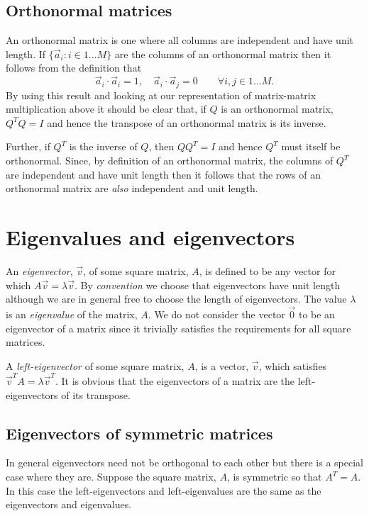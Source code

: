 \documentclass[a4paper]{article}
\newcommand{\highlight}[1]{{\color{blue}#1}}
\begin{document}
\subsection{Orthonormal matrices}

An orthonormal matrix is one where all columns are \highlight{independent} and
\highlight{have unit length}. If $\{ \vec{a}_i : i \in 1 \dots M \}$ are the
columns of an orthonormal matrix then it follows from the definition that
\highlight{\[
  \vec{a}_i \cdot \vec{a}_i = 1, \quad \vec{a}_i \cdot \vec{a}_j = 0 \qquad
  \forall i, j \in 1 \dots M.
\]}
By using this result and looking at our representation of matrix-matrix
multiplication above it should be clear that, if $Q$ is an orthonormal matrix,
$Q^TQ = I$ and hence \highlight{the transpose of an orthonormal matrix is its
inverse}.

Further, if $Q^T$ is the inverse of $Q$, then $QQ^T = I$ and hence $Q^T$ must
itself be orthonormal. Since, by definition of an orthonormal matrix, the columns
of $Q^T$ are independent and have unit length then it follows that
\highlight{the rows of an orthonormal matrix are \emph{also} independent and
unit length}.

\section{Eigenvalues and eigenvectors}

An \emph{eigenvector}, $\vec{v}$, of some \highlight{square matrix}, $A$, is
defined to be any vector for which \highlight{$A \vec{v} = \lambda \vec{v}$}. By
\emph{convention} we choose that \highlight{eigenvectors have unit length}
although we are in general free to choose the length of eigenvectors. The value
$\lambda$ is an \emph{eigenvalue} of the matrix, $A$.  \highlight{We do not
consider the vector $\vec{0}$ to be an eigenvector} of a matrix since it
trivially satisfies the requirements for all square matrices.

A \emph{left-eigenvector} of some square matrix, $A$, is a vector, $\vec{v}$,
which satisfies \highlight{$\vec{v}^T A = \lambda \vec{v}^T$}. It is obvious
that \highlight{the eigenvectors of a matrix are the left-eigenvectors of its
transpose}.

\subsection{Eigenvectors of symmetric matrices}

In general eigenvectors need not be orthogonal to each other but there is a
special case where they are. Suppose the square matrix, $A$, is symmetric so
that $A^T = A$. In this case the left-eigenvectors and left-eigenvalues are the
same as the eigenvectors and eigenvalues.
\end{document}

